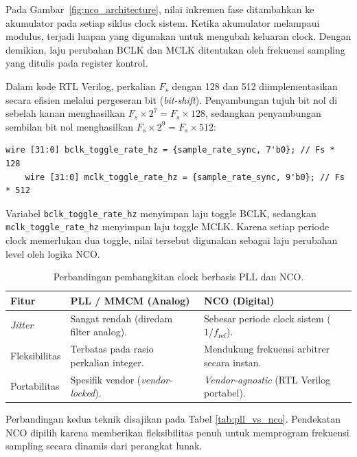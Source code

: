 \FloatBarrier

Pada Gambar~\ref{fig:nco_architecture}, nilai inkremen fase ditambahkan ke akumulator pada setiap siklus clock sistem. Ketika akumulator melampaui modulus, terjadi luapan yang digunakan untuk mengubah keluaran clock. Dengan demikian, laju perubahan BCLK dan MCLK ditentukan oleh frekuensi sampling yang ditulis pada register kontrol.

Dalam kode RTL Verilog, perkalian $F_s$ dengan 128 dan 512 diimplementasikan secara efisien melalui pergeseran bit (\textit{bit-shift}). Penyambungan tujuh bit nol di sebelah kanan menghasilkan $F_s \times 2^7 = F_s \times 128$, sedangkan penyambungan sembilan bit nol menghasilkan $F_s \times 2^9 = F_s \times 512$:

\begin{lstlisting}[breaklines=true]
	wire [31:0] bclk_toggle_rate_hz = {sample_rate_sync, 7'b0}; // Fs * 128
	wire [31:0] mclk_toggle_rate_hz = {sample_rate_sync, 9'b0}; // Fs * 512
\end{lstlisting}

Variabel \texttt{bclk\_toggle\_rate\_hz} menyimpan laju toggle BCLK, sedangkan \texttt{mclk\_toggle\_rate\_hz} menyimpan laju toggle MCLK. Karena setiap periode clock memerlukan dua toggle, nilai tersebut digunakan sebagai laju perubahan level oleh logika NCO.

\begin{table}[htbp]
\centering
\caption{Perbandingan pembangkitan clock berbasis PLL dan NCO.}

\begin{tabular}{|l|p{5.5cm}|p{5.5cm}|}
\hline
\textbf{Fitur} & \textbf{PLL / MMCM (Analog)} & \textbf{NCO (Digital)} \\
\hline
\textit{Jitter} & Sangat rendah (diredam filter analog). & Sebesar periode clock sistem ($1/f_{\mathrm{ref}}$). \\
Fleksibilitas & Terbatas pada rasio perkalian integer. & Mendukung frekuensi arbitrer secara instan. \\
Portabilitas & Spesifik vendor (\textit{vendor-locked}). & \textit{Vendor-agnostic} (RTL Verilog portabel). \\
\hline
\end{tabular}
\end{table}

Perbandingan kedua teknik disajikan pada Tabel \ref{tab:pll_vs_nco}. Pendekatan NCO dipilih karena memberikan fleksibilitas penuh untuk memprogram frekuensi sampling secara dinamis dari perangkat lunak.

